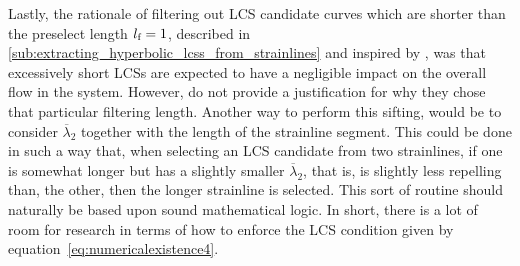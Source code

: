 Lastly, the rationale of filtering out LCS candidate curves which are shorter
than the preselect length $l_{\textnormal{f}}=1$, described in
\cref{sub:extracting_hyperbolic_lcss_from_strainlines} and inspired by
\textcite{farazmand2012computing}, was that excessively short LCSs are
expected to have a negligible impact on the overall flow in the system.
However, \citeauthor{farazmand2012computing} do not provide a justification
for why they chose that particular filtering length. Another way to perform this
sifting, would be to consider $\overline{\lambda}_{2}$ together with the length
of the strainline segment. This could be done in such a way that, when selecting
an LCS candidate from two strainlines, if one is somewhat longer but has a
slightly smaller $\overline{\lambda}_{2}$, that is, is slightly less repelling
than, the other, then the longer strainline is selected. This sort of routine
should naturally be based upon sound mathematical logic. In short, there is a
lot of room for research in terms of how to enforce the LCS condition given
by equation~\eqref{eq:numericalexistence4}.
